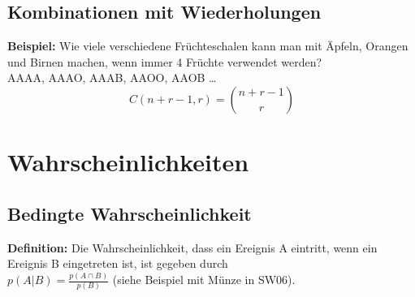 \documentclass[12pt]{scrartcl}
\begin{document}
\subsection{Kombinationen mit Wiederholungen}
\textbf{Beispiel:} Wie viele verschiedene Früchteschalen kann man mit Äpfeln, Orangen und Birnen
machen, wenn immer 4 Früchte verwendet werden?\\
AAAA, AAAO, AAAB, AAOO, AAOB \dots\\

\[C(n+r-1, r) = \binom{n+r-1}{r}\]


\section{Wahrscheinlichkeiten}
\subsection{Bedingte Wahrscheinlichkeit}
\textbf{Definition:} Die Wahrscheinlichkeit, dass ein Ereignis A eintritt, wenn ein Ereignis B eingetreten ist, ist gegeben durch\\
$p(A|B) = \frac{p(A \cap B)}{p(B)}$ (siehe Beispiel mit Münze in SW06). 




\end{document}
